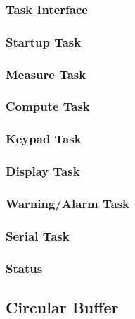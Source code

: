 \documentclass[12pt]{article} %
\begin{document}
    \subsubsection{Task Interface}
    

    \subsubsection{Startup Task}
    
    

    \subsubsection{Measure Task}
    
    

    \subsubsection{Compute Task}
    
    

    \subsubsection{Keypad Task}
    
    

    \subsubsection{Display Task}
    
    

    \subsubsection{Warning/Alarm Task}
    
    

    \subsubsection{Serial Task}
    
    

    \subsubsection{Status}
    
    

    \subsection{Circular Buffer}
    
    

    
\end{document}
